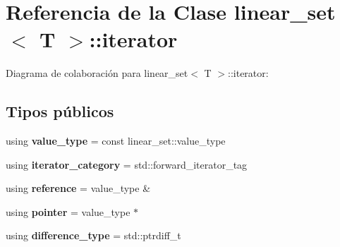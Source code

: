 \hypertarget{classlinear__set_1_1iterator}{\section{Referencia de la Clase linear\+\_\+set$<$ T $>$\+:\+:iterator}
\label{classlinear__set_1_1iterator}
}


Diagrama de colaboración para linear\+\_\+set$<$ T $>$\+:\+:iterator\+:
\subsection*{Tipos públicos}
\begin{DoxyCompactItemize}
\item 
\hypertarget{classlinear__set_1_1iterator_adc428ae224f2e66cded571df340b814e}{using {\bfseries value\+\_\+type} = const linear\+\_\+set\+::value\+\_\+type}\label{classlinear__set_1_1iterator_adc428ae224f2e66cded571df340b814e}

\item 
\hypertarget{classlinear__set_1_1iterator_ac70b54cbde97e1a59bc002979633aa41}{using {\bfseries iterator\+\_\+category} = std\+::forward\+\_\+iterator\+\_\+tag}\label{classlinear__set_1_1iterator_ac70b54cbde97e1a59bc002979633aa41}

\item 
\hypertarget{classlinear__set_1_1iterator_a1394508ada8427ad0b5764794ea59473}{using {\bfseries reference} = value\+\_\+type \&}\label{classlinear__set_1_1iterator_a1394508ada8427ad0b5764794ea59473}

\item 
\hypertarget{classlinear__set_1_1iterator_a4334a22789e11ff18a1b31982a20f944}{using {\bfseries pointer} = value\+\_\+type $\ast$}\label{classlinear__set_1_1iterator_a4334a22789e11ff18a1b31982a20f944}

\item 
\hypertarget{classlinear__set_1_1iterator_aca6addc2ad85f15d075c225c4ad3a085}{using {\bfseries difference\+\_\+type} = std\+::ptrdiff\+\_\+t}\label{classlinear__set_1_1iterator_aca6addc2ad85f15d075c225c4ad3a085}

\end{DoxyCompactItemize}
